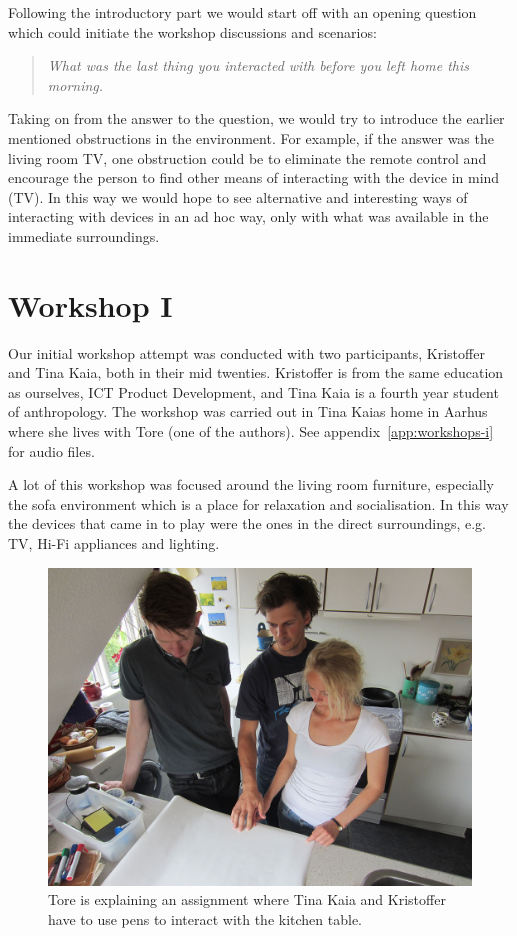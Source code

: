 Following the introductory part we would start off with an opening question which could initiate the workshop discussions and scenarios:

\begin{quotation}
  \emph{What was the last thing you interacted with before you left home this morning.}
\end{quotation}

Taking on from the answer to the question, we would try to introduce the earlier mentioned obstructions in the environment.
For example, if the answer was the living room TV, one obstruction could be to eliminate the remote control and encourage the person to find other means of interacting with the device in mind (TV).
In this way we would hope to see alternative and interesting ways of interacting with devices in an ad hoc way, only with what was available in the immediate surroundings.

\section{Workshop I}
\label{ch:workshops:workshop-i}
Our initial workshop attempt was conducted with two participants, Kristoffer and Tina Kaia, both in their mid twenties.
Kristoffer is from the same education as ourselves, ICT Product Development, and Tina Kaia is a fourth year student of anthropology.
The workshop was carried out in Tina Kaias home in Aarhus where she lives with Tore (one of the authors).
See appendix~\ref{app:workshops-i} for audio files.

A lot of this workshop was focused around the living room furniture, especially the sofa environment which is a place for relaxation and socialisation.
In this way the devices that came in to play were the ones in the direct surroundings, e.g. TV, Hi-Fi appliances and lighting.

\begin{figure}[h]
  \centering
  \includegraphics[width=.9\textwidth]{figures/kaia_moos1}
  \caption{Tore is explaining an assignment where Tina Kaia and Kristoffer have to use pens to interact with the kitchen table.}
   \label{kaia_moos1}
\end{figure}

